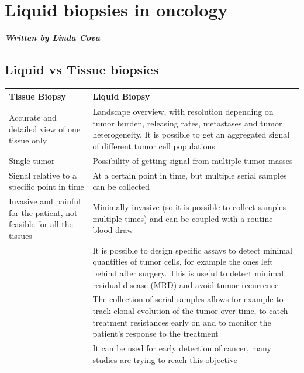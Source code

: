 \graphicspath{{chapters/LiquidBiopsiesImages/}}

\chapter{Liquid biopsies in oncology}

\textbf{\textit{Written by Linda Cova}}

\section{Liquid vs Tissue biopsies}

\begin{tabular}{ | m{5cm}| m{9cm} | }
 \hline
 \textbf{Tissue Biopsy} & \textbf{Liquid Biopsy} \\
 \hline
 Accurate and detailed view of one tissue only & Landscape overview, with resolution depending on tumor burden, releasing rates, metastases and tumor heterogeneity. It is possible to get an aggregated signal of different tumor cell populations \\
 \hline
 Single tumor & Possibility of getting signal from multiple tumor masses \\
 \hline
 Signal relative to a specific point in time & At a certain point in time, but multiple serial samples can be collected \\
 \hline
 Invasive and painful for the patient, not feasible for all the tissues & Minimally invasive (so it is possible to collect samples multiple times) and can be coupled with a routine blood draw \\
 \hline
 & It is possible to design specific assays to detect minimal quantities of tumor cells, for example the ones left behind after surgery. This is useful to detect minimal residual disease (MRD) and avoid tumor recurrence \\
 \hline
 & The collection of serial samples allows for example to track clonal evolution of the tumor over time, to catch treatment resistances early on and to monitor the patient's response to the treatment \\
 \hline
 & It can be used for early detection of cancer, many studies are trying to reach this objective \\
 \hline
\end{tabular}

